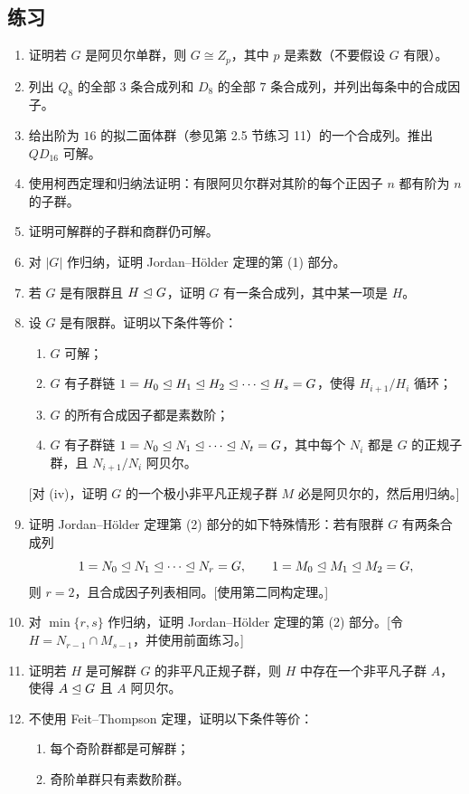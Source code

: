 \subsection*{练习}
\begin{enumerate}[label=\arabic*.]
  \item 证明若 $G$ 是阿贝尔单群，则 $G\cong Z_p$，其中 $p$ 是素数（不要假设 $G$ 有限）。
  \item 列出 $Q_8$ 的全部 $3$ 条合成列和 $D_8$ 的全部 $7$ 条合成列，并列出每条中的合成因子。
  \item 给出阶为 $16$ 的拟二面体群（参见第 2.5 节练习 11）的一个合成列。推出 $QD_{16}$ 可解。
  \item 使用柯西定理和归纳法证明：有限阿贝尔群对其阶的每个正因子 $n$ 都有阶为 $n$ 的子群。
  \item 证明可解群的子群和商群仍可解。
  \item 对 $|G|$ 作归纳，证明 Jordan--Hölder 定理的第 (1) 部分。
  \item 若 $G$ 是有限群且 $H\trianglelefteq G$，证明 $G$ 有一条合成列，其中某一项是 $H$。
  \item 设 $G$ 是有限群。证明以下条件等价：
  \begin{enumerate}[label=(\roman*)]
    \item $G$ 可解；
    \item $G$ 有子群链 $1=H_0\trianglelefteq H_1\trianglelefteq H_2\trianglelefteq\cdots\trianglelefteq H_s=G$，使得 $H_{i+1}/H_i$ 循环；
    \item $G$ 的所有合成因子都是素数阶；
    \item $G$ 有子群链 $1=N_0\trianglelefteq N_1\trianglelefteq\cdots\trianglelefteq N_t=G$，其中每个 $N_i$ 都是 $G$ 的正规子群，且 $N_{i+1}/N_i$ 阿贝尔。
  \end{enumerate}
  [对 (iv)，证明 $G$ 的一个极小非平凡正规子群 $M$ 必是阿贝尔的，然后用归纳。]
  \item 证明 Jordan--Hölder 定理第 (2) 部分的如下特殊情形：若有限群 $G$ 有两条合成列
  \[
    1=N_0\trianglelefteq N_1\trianglelefteq\cdots\trianglelefteq N_r=G,
    \qquad
    1=M_0\trianglelefteq M_1\trianglelefteq M_2=G,
  \]
  则 $r=2$，且合成因子列表相同。[使用第二同构定理。]
  \item 对 $\min\{r,s\}$ 作归纳，证明 Jordan--Hölder 定理的第 (2) 部分。[令 $H=N_{r-1}\cap M_{s-1}$，并使用前面练习。]
  \item 证明若 $H$ 是可解群 $G$ 的非平凡正规子群，则 $H$ 中存在一个非平凡子群 $A$，使得 $A\trianglelefteq G$ 且 $A$ 阿贝尔。
  \item 不使用 Feit--Thompson 定理，证明以下条件等价：
  \begin{enumerate}[label=(\roman*)]
    \item 每个奇阶群都是可解群；
    \item 奇阶单群只有素数阶群。
  \end{enumerate}
\end{enumerate}

